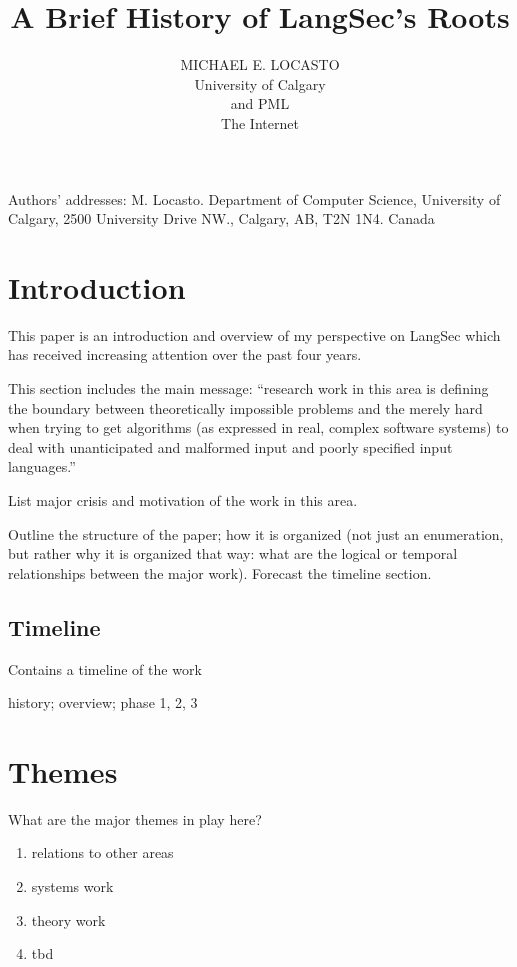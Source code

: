 \documentclass[acmcompsurv,acmnow]{acmtrans2m}
\title{A Brief History of LangSec's Roots}
\author{
MICHAEL E. LOCASTO\\
University of Calgary\\
and PML \\ 
The Internet
}
\begin{document}
            
\begin{bottomstuff} 
Authors' addresses: 
M. Locasto. Department of Computer Science, University of Calgary, 2500 University Drive NW., Calgary, AB, T2N 1N4. Canada
\newline
\end{bottomstuff}
            
\maketitle

\section{Introduction}

This paper is an introduction and overview of my perspective on LangSec
which has received increasing attention over the past four years.

This section includes the main message: ``research work in this area
is defining the boundary between theoretically impossible problems and
the merely hard when trying to get algorithms (as expressed in real,
complex software systems) to deal with unanticipated and malformed
input and poorly specified input languages.''

List major crisis and motivation of the work in this area.

Outline the structure of the paper; how it is organized (not just an
enumeration, but rather why it is organized that way: what are the
logical or temporal relationships between the major work). Forecast the
timeline section.

\subsection{Timeline}

Contains a timeline of the work

history; overview; phase 1, 2, 3

\section{Themes}

What are the major themes in play here?

\begin{enumerate}
  \item relations to other areas
  \item systems work
  \item theory work
  \item tbd
\end{enumerate}
\end{document}
